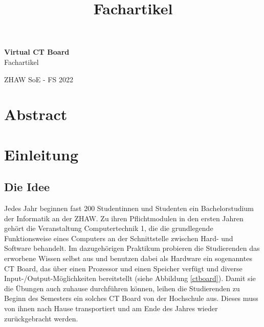\documentclass[10pt]{article}
\title{Fachartikel}
\begin{document}
\begin{titlepage}

\raggedleft %
	
	\vspace*{\baselineskip} %
	
	
	\vspace*{0.167\textheight} %
	
	\textbf{\LARGE Virtual CT Board}\\[\baselineskip] %
	
	\Huge Fachartikel\\[\baselineskip] %
	
	\vfill %
	
	{\large ZHAW SoE - FS 2022}
	
	\vspace*{3\baselineskip} %


\end{titlepage}

\section*{Abstract}
\thispagestyle{empty}

\newpage

\tableofcontents
\thispagestyle{empty}

\newpage 

\section{Einleitung}

\subsection{Die Idee}

Jedes Jahr beginnen fast 200 Studentinnen und Studenten ein Bachelorstudium der Informatik an der ZHAW. Zu ihren Pflichtmodulen in den ersten Jahren gehört die Veranstaltung \glqq Computertechnik 1\grqq, die die grundlegende Funktionsweise eines Computers an der Schnittstelle zwischen Hard- und Software behandelt. Im dazugehörigen Praktikum probieren die Studierenden das erworbene Wissen selbst aus und benutzen dabei als Hardware ein sogenanntes CT Board, das über einen Prozessor und einen Speicher verfügt und diverse Input-/Output-Möglichkeiten bereitstellt (siehe Abbildung \ref{ctboard}). Damit sie die Übungen auch zuhause durchführen können, leihen die Studierenden zu Beginn des Semesters ein solches CT Board von der Hochschule aus. Dieses muss von ihnen nach Hause transportiert und am Ende des Jahres wieder zurückgebracht werden.
\end{document}

